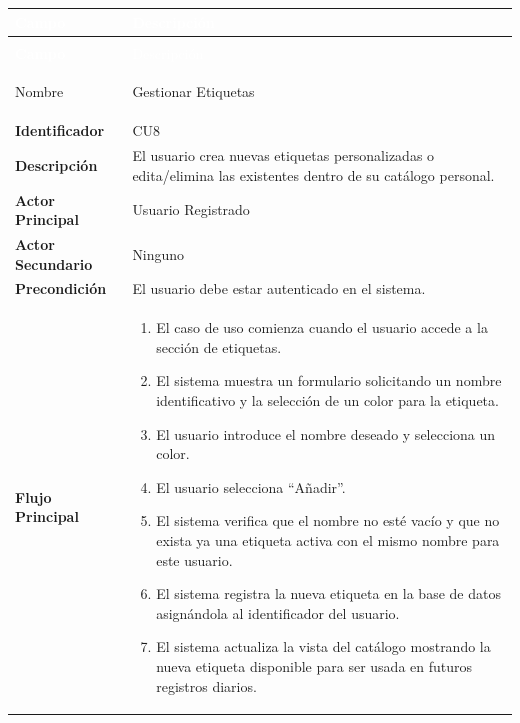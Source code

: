 \begingroup
\small 
\renewcommand{\arraystretch}{1.4}
\begin{xltabular}{\textwidth}{|>{\bfseries}p{3.5cm}|X|}
    \textcolor{white}{Campo} & \textcolor{white}{Descripción} \\ \hline
    \endfirsthead

     \\
    \hline
    \textcolor{white}{Campo} & \textcolor{white}{Descripción} \\ \hline
    \endhead

    Nombre & Gestionar Etiquetas \\ \hline
    Identificador & CU8 \\ \hline
    Descripción & El usuario crea nuevas etiquetas personalizadas o edita/elimina las existentes dentro de su catálogo personal. \\ \hline
    Actor Principal & Usuario Registrado \\ \hline
    Actor Secundario & Ninguno \\ \hline
    Precondición & El usuario debe estar autenticado en el sistema. \\ \hline
    Flujo Principal & 
    \begin{enumerate}[leftmargin=0.5cm, topsep=0pt, partopsep=0pt, parsep=0pt, itemsep=4pt]
        \item El caso de uso comienza cuando el usuario accede a la sección de etiquetas.
        \item El sistema muestra un formulario solicitando un nombre identificativo y la selección de un color para la etiqueta.
        \item El usuario introduce el nombre deseado y selecciona un color.
        \item El usuario selecciona ``Añadir''.
        \item El sistema verifica que el nombre no esté vacío y que no exista ya una etiqueta activa con el mismo nombre para este usuario.
        \item El sistema registra la nueva etiqueta en la base de datos asignándola al identificador del usuario.
        \item El sistema actualiza la vista del catálogo mostrando la nueva etiqueta disponible para ser usada en futuros registros diarios.
    \end{enumerate} 
    \\ \hline

\end{xltabular}
